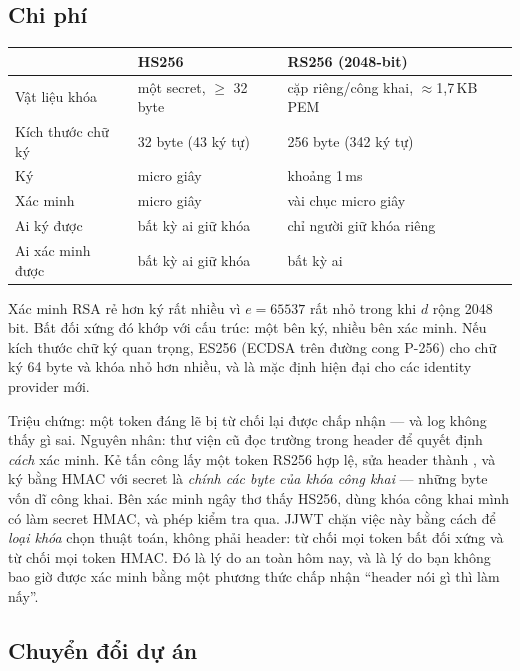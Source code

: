 \subsection{Chi phí}

\begin{center}
\begin{tabular}{@{}lll@{}}
\toprule
 & HS256 & RS256 (2048-bit) \\
\midrule
Vật liệu khóa & một secret, $\ge$ 32 byte & cặp riêng/công khai, $\approx$1,7\,KB PEM \\
Kích thước chữ ký & 32 byte (43 ký tự) & 256 byte (342 ký tự) \\
Ký & micro giây & khoảng 1\,ms \\
Xác minh & micro giây & vài chục micro giây \\
Ai ký được & bất kỳ ai giữ khóa & chỉ người giữ khóa riêng \\
Ai xác minh được & bất kỳ ai giữ khóa & bất kỳ ai \\
\bottomrule
\end{tabular}
\end{center}

Xác minh RSA rẻ hơn ký rất nhiều vì $e = 65537$ rất nhỏ trong khi $d$
rộng 2048 bit. Bất đối xứng đó khớp với cấu trúc: một bên ký, nhiều bên
xác minh. Nếu kích thước chữ ký quan trọng, ES256 (ECDSA trên đường cong
P-256) cho chữ ký 64 byte và khóa nhỏ hơn nhiều, và là mặc định hiện
đại cho các identity provider mới.

\begin{pitfall}
Triệu chứng: một token đáng lẽ bị từ chối lại được chấp nhận --- và log
không thấy gì sai. Nguyên nhân: thư viện cũ đọc trường  trong
header để quyết định \emph{cách} xác minh. Kẻ tấn công lấy một token
RS256 hợp lệ, sửa header thành , và ký bằng HMAC với
secret là \emph{chính các byte của khóa công khai} --- những byte vốn dĩ
công khai. Bên xác minh ngây thơ thấy HS256, dùng khóa công khai mình có
làm secret HMAC, và phép kiểm tra qua. JJWT chặn việc này bằng cách để
\emph{loại khóa} chọn thuật toán, không phải header:
 từ chối mọi token bất đối xứng và
 từ chối mọi token HMAC. Đó là lý do
 an toàn hôm nay, và là lý do bạn không
bao giờ được xác minh bằng một phương thức chấp nhận ``header nói gì thì
làm nấy''.
\end{pitfall}

\subsection{Chuyển đổi dự án}

